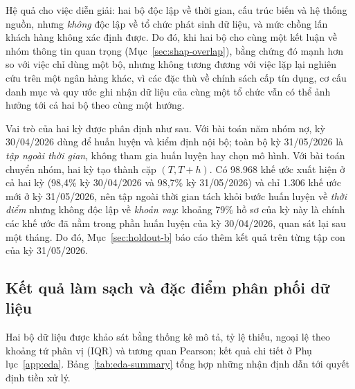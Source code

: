 Hệ quả cho việc diễn giải: hai bộ độc lập về thời gian, cấu trúc biến và hệ thống nguồn, nhưng \emph{không} độc lập về tổ chức phát sinh dữ liệu, và mức chồng lấn khách hàng không xác định được. Do đó, khi hai bộ cho cùng một kết luận về nhóm thông tin quan trọng (Mục~\ref{sec:shap-overlap}), bằng chứng đó mạnh hơn so với việc chỉ dùng một bộ, nhưng không tương đương với việc lặp lại nghiên cứu trên một ngân hàng khác, vì các đặc thù về chính sách cấp tín dụng, cơ cấu danh mục và quy ước ghi nhận dữ liệu của cùng một tổ chức vẫn có thể ảnh hưởng tới cả hai bộ theo cùng một hướng.

\medskip
Vai trò của hai kỳ được phân định như sau. Với bài toán năm nhóm nợ, kỳ 30/04/2026 dùng để huấn luyện và kiểm định nội bộ; toàn bộ kỳ 31/05/2026 là \emph{tập ngoài thời gian}, không tham gia huấn luyện hay chọn mô hình. Với bài toán chuyển nhóm, hai kỳ tạo thành cặp $(T,T+h)$. Có 98.968 khế ước xuất hiện ở cả hai kỳ (98,4\% kỳ 30/04/2026 và 98,7\% kỳ 31/05/2026) và chỉ 1.306 khế ước mới ở kỳ 31/05/2026, nên tập ngoài thời gian tách khỏi bước huấn luyện về \emph{thời điểm} nhưng không độc lập về \emph{khoản vay}: khoảng 79\% hồ sơ của kỳ này là chính các khế ước đã nằm trong phần huấn luyện của kỳ 30/04/2026, quan sát lại sau một tháng. Do đó, Mục~\ref{sec:holdout-b} báo cáo thêm kết quả trên từng tập con của kỳ 31/05/2026.

\subsection{Kết quả làm sạch và đặc điểm phân phối dữ liệu}
\label{sec:eda}

Hai bộ dữ liệu được khảo sát bằng thống kê mô tả, tỷ lệ thiếu, ngoại lệ theo khoảng tứ phân vị (IQR) và tương quan Pearson; kết quả chi tiết ở Phụ lục~\ref{app:eda}. Bảng~\ref{tab:eda-summary} tổng hợp những nhận định dẫn tới quyết định tiền xử lý.

